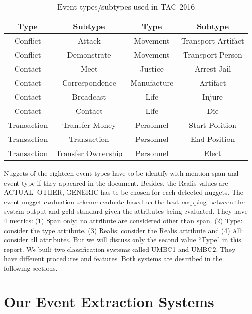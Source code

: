 \begin{table}
\begin{center}
\begin{tabular}{ |c|c|c|c| } 
 \hline
 Type & Subtype & Type & Subtype \\
 \hline
 Conflict & Attack &  Movement & Transport Artifact \\
 Conflict & Demonstrate &  Movement & Transport Person \\
 Contact & Meet & Justice & Arrest Jail \\
 Contact & Correspondence & Manufacture & Artifact \\
 Contact & Broadcast & Life & Injure \\
 Contact & Contact & Life & Die \\
 Transaction & Transfer Money & Personnel & Start Position \\
 Transaction & Transaction &  Personnel & End Position \\
 Transaction & Transfer Ownership & Personnel & Elect \\
 \hline
\end{tabular}
\caption{Event types/subtypes used in TAC 2016}
\label{table:1}
\end{center}
\end{table}
Nuggets of the eighteen event types have to be identify with mention span and event type if they appeared in the document. Besides, the Realis values are ACTUAL, OTHER, GENERIC has to be chosen for each detected nuggets. 
The event nugget evaluation scheme evaluate based on the best mapping between the system output and gold standard given the attributes being evaluated. They have 4 metrics: (1) Span only: no attribute are considered other than span. (2) Type: consider the type attribute. (3) Realis: consider the Realis attribute and (4) All: consider all attributes. But we will discuss only the second value “Type” in this report. We built two classification systems called UMBC1 and UMBC2. They have different procedures and features. Both systems are described in the following sections. 
\section{Our Event Extraction Systems}
\label{oursystem}
